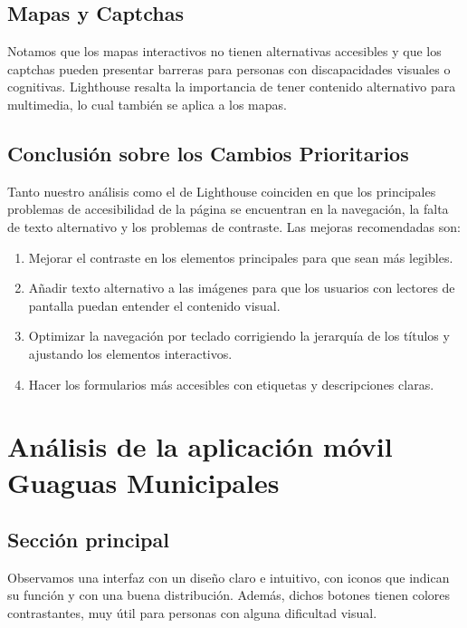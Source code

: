 \documentclass[a4paper,12pt]{article}
\begin{document}
\subsection{Mapas y Captchas}
Notamos que los mapas interactivos no tienen alternativas accesibles y que los captchas pueden presentar barreras para personas con discapacidades visuales o cognitivas. Lighthouse resalta la importancia de tener contenido alternativo para multimedia, lo cual también se aplica a los mapas.

\subsection{Conclusión sobre los Cambios Prioritarios}
Tanto nuestro análisis como el de Lighthouse coinciden en que los principales problemas de accesibilidad de la página se encuentran en la navegación, la falta de texto alternativo y los problemas de contraste. Las mejoras recomendadas son:

\begin{enumerate}
    \item Mejorar el contraste en los elementos principales para que sean más legibles.
    \item Añadir texto alternativo a las imágenes para que los usuarios con lectores de pantalla puedan entender el contenido visual.
    \item Optimizar la navegación por teclado corrigiendo la jerarquía de los títulos y ajustando los elementos interactivos.
    \item Hacer los formularios más accesibles con etiquetas y descripciones claras.
\end{enumerate}

\newpage

\section{Análisis de la aplicación móvil Guaguas Municipales}
\subsection{Sección principal}
Observamos una interfaz con un diseño claro e intuitivo, con iconos que indican su función y con una buena distribución. Además,  dichos botones tienen colores contrastantes, muy útil para personas con alguna dificultad visual.
\end{document}
